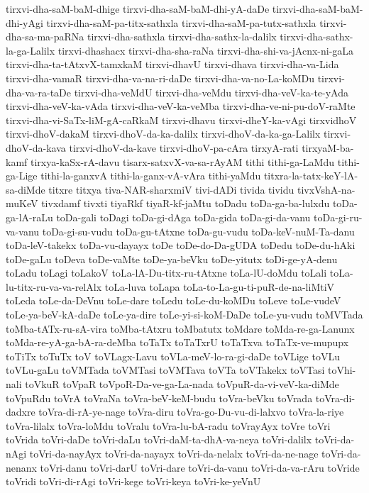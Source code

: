 {tirxvi-dha-saM-baM-dhige
tirxvi-dha-saM-baM-dhi-yA-daDe
tirxvi-dha-saM-baM-dhi-yAgi
tirxvi-dha-saM-pa-titx-sathxla
tirxvi-dha-saM-pa-tutx-sathxla
tirxvi-dha-sa-ma-paRNa
tirxvi-dha-sathxla
tirxvi-dha-sathx-la-dalilx
tirxvi-dha-sathx-la-ga-Lalilx
tirxvi-dhashacx
tirxvi-dha-sha-raNa
tirxvi-dha-shi-va-jAcnx-ni-gaLa
tirxvi-dha-ta-tAtxvX-tamxkaM
tirxvi-dhavU
tirxvi-dhava
tirxvi-dha-va-Lida
tirxvi-dha-vamaR
tirxvi-dha-va-na-ri-daDe
tirxvi-dha-va-no-La-koMDu
tirxvi-dha-va-ra-taDe
tirxvi-dha-veMdU
tirxvi-dha-veMdu
tirxvi-dha-veV-ka-te-yAda
tirxvi-dha-veV-ka-vAda
tirxvi-dha-veV-ka-veMba
tirxvi-dha-ve-ni-pu-doV-raMte
tirxvi-dha-vi-SaTx-liM-gA-caRkaM
tirxvi-dhavu
tirxvi-dheY-ka-vAgi
tirxvidhoV
tirxvi-dhoV-dakaM
tirxvi-dhoV-da-ka-dalilx
tirxvi-dhoV-da-ka-ga-Lalilx
tirxvi-dhoV-da-kava
tirxvi-dhoV-da-kave
tirxvi-dhoV-pa-cAra
tirxyA-rati
tirxyaM-ba-kamf
tirxya-kaSx-rA-davu
tisarx-satxvX-va-sa-rAyAM
tithi
tithi-ga-LaMdu
tithi-ga-Lige
tithi-la-ganxvA
tithi-la-ganx-vA-vAra
tithi-yaMdu
titxra-la-tatx-keY-lA-sa-diMde
titxre
titxya
tiva-NAR-sharxmiV
tivi-dADi
tivida
tividu
tivxVshA-na-muKeV
tivxdamf
tivxti
tiyaRkf
tiyaR-kf-jaMtu
toDadu
toDa-ga-ba-lulxdu
toDa-ga-lA-raLu
toDa-gali
toDagi
toDa-gi-dAga
toDa-gida
toDa-gi-da-vanu
toDa-gi-ru-va-vanu
toDa-gi-su-vudu
toDa-gu-tAtxne
toDa-gu-vudu
toDa-keV-nuM-Ta-danu
toDa-leV-takekx
toDa-vu-dayayx
toDe
toDe-do-Da-gUDA
toDedu
toDe-du-hAki
toDe-gaLu
toDeva
toDe-vaMte
toDe-ya-beVku
toDe-yitutx
toDi-ge-yA-denu
toLadu
toLagi
toLakoV
toLa-lA-Du-titx-ru-tAtxne
toLa-lU-doMdu
toLali
toLa-lu-titx-ru-va-va-relAlx
toLa-luva
toLapa
toLa-to-La-gu-ti-puR-de-na-liMtiV
toLeda
toLe-da-DeVnu
toLe-dare
toLedu
toLe-du-koMDu
toLeve
toLe-vudeV
toLe-ya-beV-kA-daDe
toLe-ya-dire
toLe-yi-si-koM-DaDe
toLe-yu-vudu
toMVTada
toMba-tATx-ru-sA-vira
toMba-tAtxru
toMbatutx
toMdare
toMda-re-ga-Lanunx
toMda-re-yA-ga-bA-ra-deMba
toTaTx
toTaTxrU
toTaTxva
toTaTx-ve-mupupx
toTiTx
toTuTx
toV
toVLagx-Lavu
toVLa-meV-lo-ra-gi-daDe
toVLige
toVLu
toVLu-gaLu
toVMTada
toVMTasi
toVMTava
toVTa
toVTakekx
toVTasi
toVhi-nali
toVkuR
toVpaR
toVpoR-Da-ve-ga-La-nada
toVpuR-da-vi-veV-ka-diMde
toVpuRdu
toVrA
toVraNa
toVra-beV-keM-budu
toVra-beVku
toVrada
toVra-di-dadxre
toVra-di-rA-ye-nage
toVra-diru
toVra-go-Du-vu-di-lalxvo
toVra-la-riye
toVra-lilalx
toVra-loMdu
toVralu
toVra-lu-bA-radu
toVrayAyx
toVre
toVri
toVrida
toVri-daDe
toVri-daLu
toVri-daM-ta-dhA-va-neya
toVri-dalilx
toVri-da-nAgi
toVri-da-nayAyx
toVri-da-nayayx
toVri-da-nelalx
toVri-da-ne-nage
toVri-da-nenanx
toVri-danu
toVri-darU
toVri-dare
toVri-da-vanu
toVri-da-va-rAru
toVride
toVridi
toVri-di-rAgi
toVri-kege
toVri-keya
toVri-ke-yeVnU
}
